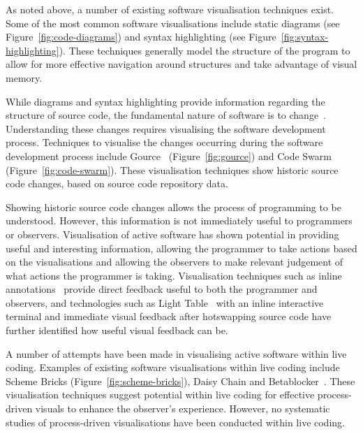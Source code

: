   

As noted above, a number of existing software visualisation techniques exist. Some of the most common software visualisations include static diagrams (see Figure~\ref{fig:code-diagrams}) and syntax highlighting (see Figure~\ref{fig:syntax-highlighting}). These techniques generally model the structure of the program to allow for more effective navigation around structures and take advantage of visual memory.

While diagrams and syntax highlighting provide information regarding the structure of source code, the fundamental nature of software is to change~\cite{Brooks1995}. Understanding these changes requires visualising the software development process. Techniques to visualise the changes occurring during the software development process include Gource~\cite{Caudwell2010} (Figure~\ref{fig:gource}) and Code Swarm~\cite{Ogawa2012} (Figure~\ref{fig:code-swarm}). These visualisation techniques show historic source code changes, based on source code repository data.

Showing historic source code changes allows the process of programming to be understood. However, this information is not immediately useful to programmers or observers. Visualisation of active software has shown potential in providing useful and interesting information, allowing the programmer to take actions based on the visualisations and allowing the observers to make relevant judgement of what actions the programmer is taking. Visualisation techniques such as inline annotations~\cite{Swift2013,Beck2013} provide direct feedback useful to both the programmer and observers, and technologies such as Light Table~\cite{Kodowa2014} with an inline interactive terminal and immediate visual feedback after hotswapping source code have further identified how useful visual feedback can be.

A number of attempts have been made in visualising active software within live coding. Examples of existing software visualisations within live coding include Scheme Bricks (Figure~\ref{fig:scheme-bricks}), Daisy Chain and Betablocker~\cite{McLean2010a}. These visualisation techniques suggest potential within live coding for effective process-driven visuals to enhance the observer's experience. However, no systematic studies of process-driven visualisations have been conducted within live coding.


